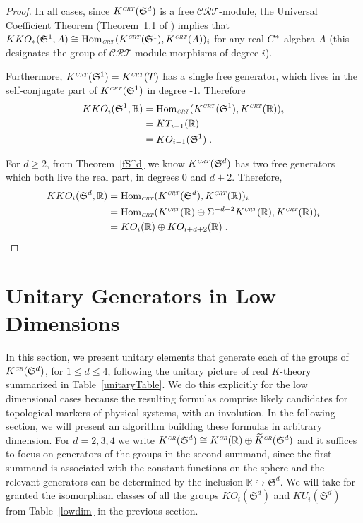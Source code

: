 \documentclass[12pt, reqno]{amsart}
\newtheorem{thm}{Theorem}[section]
\theoremstyle{definition}
\def\R{{\mathbb R}}
\def\pr{^{\scriptscriptstyle \R}}
\def\crr{^{\scriptscriptstyle {\it CR}}}
\def\crt{^{\scriptscriptstyle {\it CRT}}}
\def\scrt{_{\scriptscriptstyle {\it CRT}}}
\newcommand{\fS}{\mathfrak S}
\def\hom{\text {Hom}}
\begin{document}
\begin{proof}
In all cases, since $K\crt(\fS^d)$ is a free $\mathcal{CRT}$-module, the Universal Coefficient Theorem (Theorem~1.1 of \cite{Boer2004}) implies that
$KKO_*( \fS^1, A) \cong \hom\scrt( K\crt(\fS^1), K\crt(A))_i$ for any real $C \sp *$-algebra $A$ 
(this designates the group of $\mathcal{CRT}$-module morphisms of degree $i$). 

Furthermore, $K\crt(\fS^1) = K\crt(T)$ has a single free generator, which lives in the self-conjugate part of $K\crt(\fS^1)$ in degree -1. Therefore
\begin{align*}
KKO_i( \fS^1, \R) &= \hom_{\scriptscriptstyle {\it CRT}}( K\crt(\fS^1), K\crt(\R))_i \\
	&= KT_{i-1}(\R) \\
	&= KO_{i-1}(\fS^1) \; .
\end{align*}


For $d \geq 2$, from Theorem~\ref{fS^d} we know $K\crt(\fS^d)$ has two free generators which both live the real part, in degrees 0 and $d+2$. Therefore,
\begin{align*}
KKO_i( \fS^d, \R) &= \hom_{\scriptscriptstyle {\it CRT}}( K\crt(\fS^d), K\crt(\R))_i   \\
	&=  \hom_{\scriptscriptstyle {\it CRT}}( K\crt(\R) \oplus \Sigma^{-d-2} K\crt(\R), K\crt(\R))_i   \\
	&= KO_i(\R) \oplus KO_{i+d+2}(\R)  \; .
\end{align*}
\end{proof}


\section{Unitary Generators in Low Dimensions} \label{section-lowdim}

In this section, we present unitary elements that generate each of the groups of $K\crr(\fS^d)$, for $1 \leq d \leq 4$, following the unitary picture of real $K$-theory summarized in Table~\ref{unitaryTable}. 
We do this explicitly for the low dimensional cases because the resulting formulas comprise likely candidates for topological markers of physical systems, with an involution. In the following section, we will present an algorithm building these formulas in arbitrary dimension.
For $d = 2,3,4$ we write $K\crr(\fS^d) \cong K\crr(\R) \oplus \widetilde{K}\crr(\fS^d)$ and it suffices to focus on generators of the groups in the second summand, since the first summand is associated with the constant functions on the sphere and the relevant generators can be determined by the inclusion $\R \hookrightarrow \fS^d$. We will take for granted the isomorphism classes of all the groups $KO_i(\fS^d)$ and $KU_i(\fS^d)$ from Table~\ref{lowdim} in the previous section.
\end{document}
